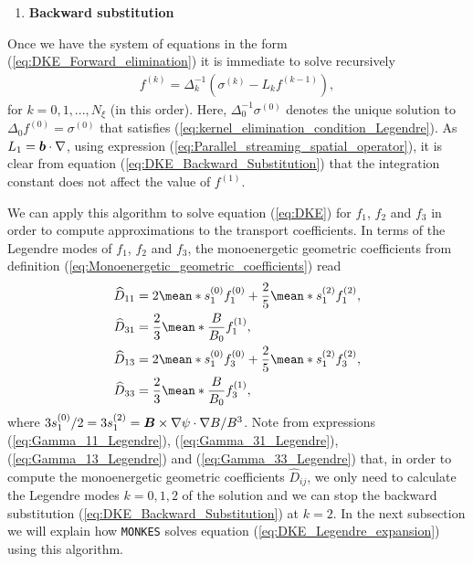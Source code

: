 \documentclass[10pt]{iopart}
\newcommand{\MONKES}{{\texttt{MONKES}}}
\begin{document}
\begin{enumerate}[resume]
	\item \textbf{Backward substitution}
\end{enumerate}
Once we have the system of equations in the form (\ref{eq:DKE_Forward_elimination}) it is immediate to solve recursively
%
\begin{align}
	f^{(k)} = 
	\Delta_k^{-1}
	\left( 
	\sigma^{(k)} -  L_{k} f^{(k-1)} 
	\right), 	\label{eq:DKE_Backward_Substitution}
\end{align}
for $k=0,1,...,N_\xi$ (in this order). Here, $\Delta_0^{-1} \sigma^{(0)}$ denotes the unique solution to $\Delta_0 f^{(0)} = \sigma^{(0)} $ that satisfies (\ref{eq:kernel_elimination_condition_Legendre}). As $L_1= \vb*{b}\cdot \nabla$, using expression (\ref{eq:Parallel_streaming_spatial_operator}), it is clear from equation (\ref{eq:DKE_Backward_Substitution}) that the integration constant does not affect the value of $f^{(1)}$.

We can apply this algorithm to solve equation (\ref{eq:DKE}) for $f_1$, $f_2$ and $f_3$ in order to compute approximations to the transport coefficients. In terms of the Legendre modes of $f_1$, $f_2$ and $f_3$, the monoenergetic geometric coefficients from definition (\ref{eq:Monoenergetic_geometric_coefficients}) read
%
\begin{align}
	\widehat{D}_{11} & = 2\mean*{s_1^{(0)} f_1^{(0)}} + \frac{2}{5}\mean*{s_1^{(2)} f_1^{(2)}}, 
	\label{eq:Gamma_11_Legendre}\\ 
	\widehat{D}_{31} & = \frac{2}{3} \mean*{\frac{B}{B_0} f_1^{(1)}},\label{eq:Gamma_31_Legendre}\\ 
	\widehat{D}_{13} & = 2\mean*{s_1^{(0)} f_3^{(0)}} + \frac{2}{5}\mean*{s_1^{(2)} f_3^{(2)}}, \label{eq:Gamma_13_Legendre}\\ 
	\widehat{D}_{33} & =\frac{2}{3} \mean*{\frac{B}{B_0} f_3^{(1)}}, \label{eq:Gamma_33_Legendre}
\end{align}
where $3s_1^{(0)} /2= 3s_1^{(2)} = \vb*{B}\times\nabla\psi \cdot \nabla B / B^3$. Note  from expressions (\ref{eq:Gamma_11_Legendre}), (\ref{eq:Gamma_31_Legendre}), (\ref{eq:Gamma_13_Legendre}) and (\ref{eq:Gamma_33_Legendre}) that, in order to compute the monoenergetic geometric coefficients $\widehat{D}_{ij}$, we only need to calculate the Legendre modes $k=0,1,2$ of the solution and we can stop the backward substitution (\ref{eq:DKE_Backward_Substitution}) at $k=2$. In the next subsection we will explain how {\MONKES} solves equation (\ref{eq:DKE_Legendre_expansion}) using this algorithm.
\end{document}
